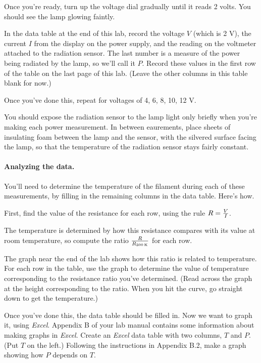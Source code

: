 Once you're ready, turn up the voltage dial gradually until it reads 2 volts.
You should see the lamp glowing faintly.

In the data table at the end of this lab, record the voltage $V$ (which is 2 V),
the current $I$ from the display on the power supply,
and the reading on the voltmeter
attached to the radiation sensor. The last number is a measure
of the power being radiated by the lamp, so we'll call it $P$. 
Record these values
in the first row of the table on the last page of this lab. (Leave
the other columns in this table blank for now.)

Once you've done this, repeat for voltages of 4, 6, 8, 10, 12 V.

You should expose the radiation sensor to the lamp light only briefly
when you're making each power measurement. In between eaurements, place 
sheets of insulating foam between the lamp and the sensor, with the silvered
surface facing the lamp, so that the temperature of the radiation sensor
stays fairly constant.


\paragraph{Analyzing the data.}
You'll need to determine the temperature of the filament during each of these
measurements, by filling in the remaining columns in the data table. Here's
how. 

First, find the value of the resistance for each row, using the rule $R={V\over 
I}$. 

The temperature is determined by how this resistance compares with its
value at room temperature, so compute the ratio ${R\over R_{300\,{\rm K}}}$
for each row.

The graph near the end of the lab 
shows how this ratio is related to temperature.
For each row in the table, use the graph to determine the value of 
temperature corresponding to the resistance ratio you've determined.
(Read across the graph at the height corresponding to the ratio.
When you hit the curve, go straight down to get the temperature.)

Once you've done this, the data table should be filled in.
Now we want to graph it, using \textit{Excel}. Appendix B of your
lab manual contains some information about making graphs in \textit{Excel}.
Create an \textit{Excel} data table with two columns, $T$ and $P$. (Put
$T$ on the left.) Following the instructions in Appendix B.2, make
a graph showing how $P$ depends on $T$. 

